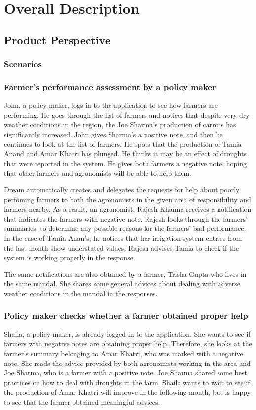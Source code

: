 \chapter{Overall Description}

\section{Product Perspective}
\subsection{Scenarios}
\subsection*{Farmer's performance assessment by a policy maker}
John, a policy maker, logs in to the application to see how farmers are performing. He goes through the list of farmers and notices that despite very dry weather conditions in the region, the Joe Sharma's production of carrots has significantly increased. John gives Sharma's a positive note, and then he continues to look at the list of farmers. He spots that the production of Tamia Anand and Amar Khatri has plunged. He thinks it may be an effect of droughts that were reported in the system. He gives both farmers a negative note, hoping that other farmers and agronomists will be able to help them. 

Dream automatically creates and delegates the requests for help about poorly perfoming farmers to both the agronomists in the given area of responsibility and farmers nearby. As a result, an agronomist, Rajesh Khanna receives a notification that indicates the farmers with negative note. Rajesh looks through the farmers' summaries, to determine any possible reasons for the farmers' bad performance. In the case of Tamia Anan's, he notices that her irrigation system entries from the last month show understated values. Rajesh advises Tamia to check if the system is working properly in the response. 

The same notifications are also obtained by a farmer, Trisha Gupta who lives in the same mandal. She shares some general advices about dealing with adverse weather conditions in the mandal in the responses.

\subsection*{Policy maker checks whether a farmer obtained proper help}
Shaila, a policy maker, is already logged in to the application. She wants to see if farmers with negative notes are obtaining proper help. Therefore, she looks at the farmer's summary belonging to Amar Khatri, who was marked with a negative note. She reads the advice provided by both agronomists working in the area and Joe Sharma, who is a farmer with a positive note. Joe Sharma shared some best practices on how to deal with droughts in the farm. Shaila wants to wait to see if the production of Amar Khatri will improve in the following month, but is happy to see that the farmer obtained meaningful advices.

